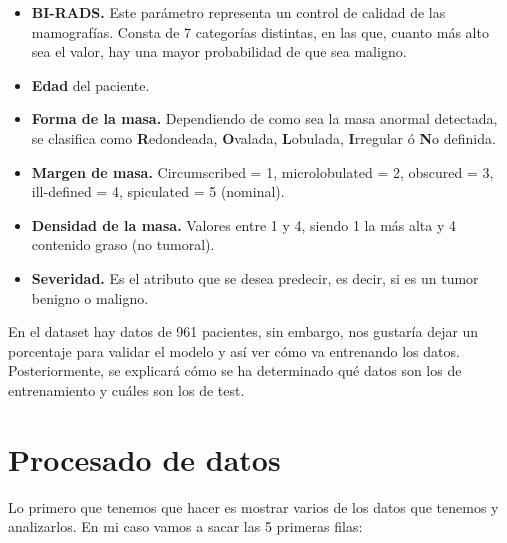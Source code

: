 \documentclass[11pt,a4paper]{article}
\begin{document}
\begin{itemize}
	\item \textbf{BI-RADS.} Este parámetro representa un control de calidad de las mamografías. Consta de 7 categorías distintas,
		  en las que, cuanto más alto sea el valor, hay una mayor probabilidad de que sea maligno.

	\item \textbf{Edad} del paciente.
	
	\item \textbf{Forma de la masa.} Dependiendo de como sea la masa anormal detectada, se clasifica como \textbf{R}edondeada,
		  \textbf{O}valada, \textbf{L}obulada, \textbf{I}rregular ó \textbf{N}o definida.

	\item \textbf{Margen de masa.} Circumscribed = 1, microlobulated = 2, obscured = 3, ill-defined = 4, spiculated = 5 (nominal).
	
	\item \textbf{Densidad de la masa.} Valores entre 1 y 4, siendo 1 la más alta y 4 contenido graso (no tumoral).
	
	\item \textbf{Severidad.} Es el atributo que se desea predecir, es decir, si es un tumor benigno o maligno.	

\end{itemize}

En el dataset hay datos de 961 pacientes, sin embargo, nos gustaría dejar un porcentaje para validar el modelo y así ver cómo va
entrenando los datos. Posteriormente, se explicará cómo se ha determinado qué datos son los de entrenamiento y cuáles son los de
test.

\newpage

\section{Procesado de datos}

Lo primero que tenemos que hacer es mostrar varios de los datos que tenemos y analizarlos. En mi caso vamos a sacar las 5 primeras
filas:

\begin{table}[H]
    \centering
\end{table}
\end{document}
